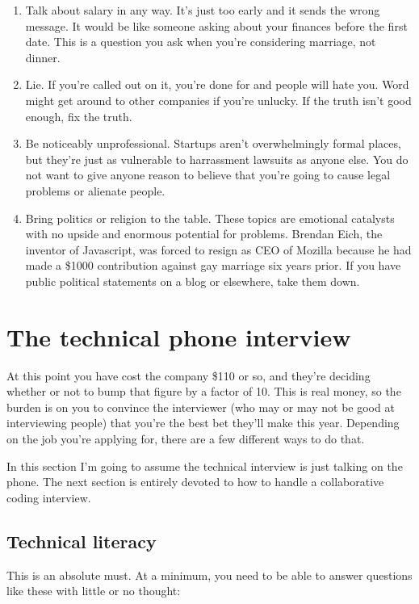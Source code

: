 \documentclass{article}
\begin{document}
\begin{enumerate}
\item{Talk about salary in any way. It's just too early and it sends the}
  wrong message. It would be like someone asking about your finances before
  the first date. This is a question you ask when you're considering
  marriage, not dinner.

\item{Lie. If you're called out on it, you're done for and people will}
  hate you. Word might get around to other companies if you're unlucky. If
  the truth isn't good enough, fix the truth.

\item{Be noticeably unprofessional. Startups aren't overwhelmingly formal}
  places, but they're just as vulnerable to harrassment lawsuits as anyone
  else. You do not want to give anyone reason to believe that you're going
  to cause legal problems or alienate people.

\item{Bring politics or religion to the table. These topics are emotional}
  catalysts with no upside and enormous potential for problems. Brendan
  Eich, the inventor of Javascript, was forced to resign as CEO of Mozilla
  because he had made a \$1000 contribution against gay marriage six years
  prior. If you have public political statements on a blog or elsewhere,
  take them down.
\end{enumerate}

\section{The technical phone interview}\label{sec:technical-phone-interview}
  At this point you have cost the company \$110 or so, and they're deciding
  whether or not to bump that figure by a factor of 10. This is real money, so
  the burden is on you to convince the interviewer (who may or may not be good
  at interviewing people) that you're the best bet they'll make this year.
  Depending on the job you're applying for, there are a few different ways to
  do that.

  In this section I'm going to assume the technical interview is just talking
  on the phone. The next section is entirely devoted to how to handle a
  collaborative coding interview.

\subsection{Technical literacy}
    This is an absolute must. At a minimum, you need to be able to answer
    questions like these with little or no thought:
\end{document}
